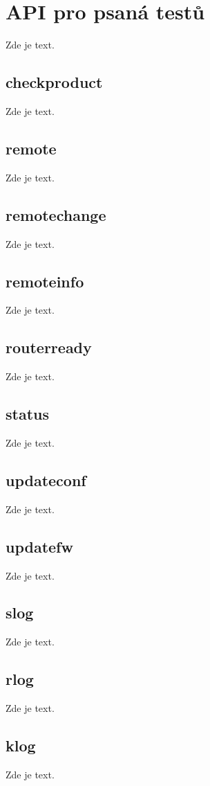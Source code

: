 \chapter{API pro psaná testů}

Zde je text.

\section{checkproduct}

Zde je text.

\section{remote}

Zde je text.

\section{remotechange}

Zde je text.

\section{remoteinfo}

Zde je text.

\section{routerready}

Zde je text.

\section{status}

Zde je text.

\section{updateconf}

Zde je text.

\section{updatefw}

Zde je text.

\section{slog}

Zde je text.

\section{rlog}

Zde je text.

\section{klog}

Zde je text.

\endinput
